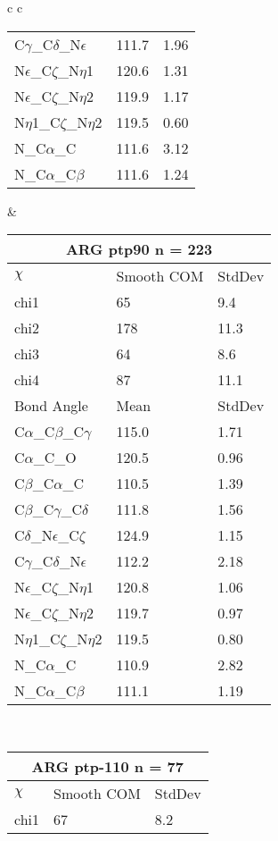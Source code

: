 \begin{longtable}{ c c }
\begin{tabular}{ l l l }
  C$\gamma$\_C$\delta$\_N$\epsilon$ & 111.7 & 1.96\\
  N$\epsilon$\_C$\zeta$\_N$\eta$1 & 120.6 & 1.31\\
  N$\epsilon$\_C$\zeta$\_N$\eta$2 & 119.9 & 1.17\\
  N$\eta$1\_C$\zeta$\_N$\eta$2 & 119.5 & 0.60\\
  N\_C$\alpha$\_C & 111.6 & 3.12\\
  N\_C$\alpha$\_C$\beta$ & 111.6 & 1.24\\
  \bottomrule
  \end{tabular}
  &
  \begin{tabular}{ l l l }
  \toprule
  \multicolumn{3}{c}{ARG \textbf{ptp90} n = 223} \\ \toprule
  $\chi$       & Smooth COM & StdDev \\ \midrule
  chi1 & 65 & 9.4 \\ 
  chi2 & 178 & 11.3 \\ 
  chi3 & 64 & 8.6 \\ 
  chi4 & 87 & 11.1 \\ \midrule
  Bond Angle   & Mean     & StdDev \\ \midrule
  C$\alpha$\_C$\beta$\_C$\gamma$ & 115.0 & 1.71\\
  C$\alpha$\_C\_O & 120.5 & 0.96\\
  C$\beta$\_C$\alpha$\_C & 110.5 & 1.39\\
  C$\beta$\_C$\gamma$\_C$\delta$ & 111.8 & 1.56\\
  C$\delta$\_N$\epsilon$\_C$\zeta$ & 124.9 & 1.15\\
  C$\gamma$\_C$\delta$\_N$\epsilon$ & 112.2 & 2.18\\
  N$\epsilon$\_C$\zeta$\_N$\eta$1 & 120.8 & 1.06\\
  N$\epsilon$\_C$\zeta$\_N$\eta$2 & 119.7 & 0.97\\
  N$\eta$1\_C$\zeta$\_N$\eta$2 & 119.5 & 0.80\\
  N\_C$\alpha$\_C & 110.9 & 2.82\\
  N\_C$\alpha$\_C$\beta$ & 111.1 & 1.19\\
  \bottomrule
  \end{tabular}
  \\
  \begin{tabular}{ l l l }
  \toprule
  \multicolumn{3}{c}{ARG \textbf{ptp-110} n = 77} \\ \toprule
  $\chi$       & Smooth COM & StdDev \\ \midrule
  chi1 & 67 & 8.2 \\ 

\end{tabular}
\end{longtable}
